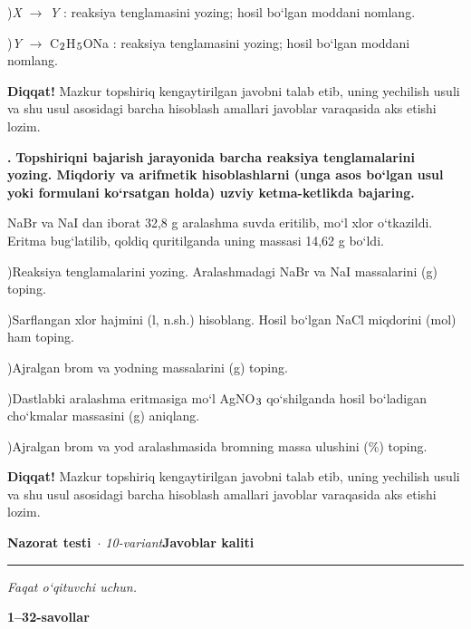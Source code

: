\documentclass[11pt,a4paper]{article}
\renewcommand{\textsubscript}[1]{\ensuremath{_{\text{\fontsize{8}{8}\selectfont #1}}}}
\newcommand{\qn}[1]{\textbf{\fontsize{11.5}{13}\selectfont #1}}
\newcommand{\qsep}{\par\vspace{1pt}\noindent\rule{0pt}{0.4pt}\par\vspace{5pt}}
\newcommand{\diqqat}[1]{\par\smallskip\noindent\textbf{Diqqat!} #1\par\medskip}
\begin{document}
)\textit{X} $\to$ \textit{Y} : reaksiya tenglamasini yozing; hosil bo`lgan moddani nomlang.\par
{})\textit{Y} $\to$ C\textsubscript{2}H\textsubscript{5}ONa : reaksiya tenglamasini yozing; hosil bo`lgan moddani nomlang.\par
\diqqat{Mazkur topshiriq kengaytirilgan javobni talab etib, uning yechilish usuli va shu usul asosidagi barcha hisoblash amallari javoblar varaqasida aks etishi lozim.}\qsep
\noindent\qn{43.} \textbf{Topshiriqni bajarish jarayonida barcha reaksiya tenglamalarini yozing. Miqdoriy va arifmetik hisoblashlarni (unga asos bo`lgan usul yoki formulani ko`rsatgan holda) uzviy ketma-ketlikda bajaring.}\par\smallskip
NaBr va NaI dan iborat 32,8 g aralashma suvda eritilib, mo`l xlor o`tkazildi. Eritma bug`latilib, qoldiq quritilganda uning massasi 14,62 g bo`ldi.\par
{})Reaksiya tenglamalarini yozing. Aralashmadagi NaBr va NaI massalarini (g) toping.\par
{})Sarflangan xlor hajmini (l, n.sh.) hisoblang. Hosil bo`lgan NaCl miqdorini (mol) ham toping.\par
{})Ajralgan brom va yodning massalarini (g) toping.\par
{})Dastlabki aralashma eritmasiga mo`l AgNO\textsubscript{3} qo`shilganda hosil bo`ladigan cho`kmalar massasini (g) aniqlang.\par
{})Ajralgan brom va yod aralashmasida bromning massa ulushini (\%) toping.\par
\diqqat{Mazkur topshiriq kengaytirilgan javobni talab etib, uning yechilish usuli va shu usul asosidagi barcha hisoblash amallari javoblar varaqasida aks etishi lozim.}\qsep
\newpage
\noindent\textbf{\fontsize{13}{15}\selectfont Nazorat testi}\ \textit{$\cdot$ 10-variant}\hfill \textbf{Javoblar kaliti}\par\smallskip\hrule\smallskip
\textit{Faqat o`qituvchi uchun.}\par\medskip
\noindent\textbf{1--32-savollar}\par\smallskip
\end{document}
